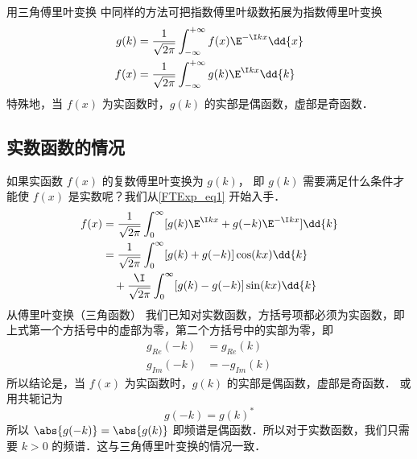 
\begin{issues}
\issueAbstract
\end{issues}


用三角傅里叶变换  中同样的方法可把指数傅里叶级数拓展为指数傅里叶变换
\begin{align}\label{FTExp_eq6}
g(k) &= \frac{1}{\sqrt{2\pi }} \int_{-\infty }^{+\infty } f(x)\E^{-\I kx} \dd{x} \\
f(x) &= \frac{1}{\sqrt{2\pi }} \int_{-\infty }^{+\infty } g(k)\E^{\I kx} \dd{k} \label{FTExp_eq1}
\end{align}
特殊地，当 $f(x)$ 为实函数时，$g(k)$ 的实部是偶函数，虚部是奇函数．

\subsection{实数函数的情况}

如果实函数 $f(x)$ 的复数傅里叶变换为 $g(k)$， 即 $g(k)$ 需要满足什么条件才能使 $f(x)$ 是实数呢？我们从\autoref{FTExp_eq1} 开始入手．
\begin{equation}\begin{aligned}
f(x) &= \frac{1}{\sqrt{2\pi }} \int_0^\infty [g(k)\E^{\I kx} + g(-k)\E^{-\I kx}] \dd{k} \\
&= \frac{1}{\sqrt{2\pi }} \int_0^\infty [g(k)+g(-k)]\cos(kx)\dd{k}\\
&\quad + \frac{\I}{\sqrt{2\pi }} \int_0^\infty [g(k)-g(-k)]\sin(kx) \dd{k}
\end{aligned}\end{equation}
从傅里叶变换（三角函数）%
我们已知对实数函数，方括号项都必须为实函数，即上式第一个方括号中的虚部为零，第二个方括号中的实部为零，即
\begin{equation}\begin{aligned}
g_{Re}(-k) &= g_{Re}(k)\\
g_{Im}(-k) &= -g_{Im}(k)
\end{aligned}\end{equation}
所以结论是，当 $f(x)$ 为实函数时，$g(k)$ 的实部是偶函数，虚部是奇函数． 或用共轭记为
\begin{equation}\label{FTExp_eq5}
g(-k) = g(k)^*
\end{equation}
所以 $\abs{g(-k)} = \abs{g(k)}$ 即频谱是偶函数．所以对于实数函数，我们只需要 $k>0$ 的频谱．这与三角傅里叶变换的情况一致．

